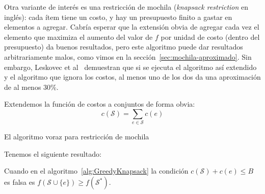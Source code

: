   Otra variante de interés es una restricción de mochila
  (\emph{\foreignlanguage{english}{knapsack restriction}} en inglés):
  cada ítem tiene un costo,
  y hay un presupuesto finito a gastar en elementos a agregar.
  Cabría esperar que la extensión obvia
  de agregar cada vez el elemento que maximiza el aumento del valor de \(f\)
  por unidad de costo
  (dentro del presupuesto)
  da buenos resultados,
  pero este algoritmo puede dar resultados arbitrariamente malos,
  como vimos en la sección~\ref{sec:mochila-aproximado}.
  Sin embargo,
  Leskovec et al~%
    \cite{leskovec07:_cost_effective_outbreak_detection_networks}
  demuestran que si se ejecuta el algoritmo así extendido
  y el algoritmo que ignora los costos,
  al menos uno de los dos da una aproximación de al menos 30\%.

  Extendemos la función de costos a conjuntos de forma obvia:
  \begin{equation*}
    c(\mathscr{S})
      = \sum_{e \in \mathscr{S}} c(e)
  \end{equation*}
  \begin{algorithm}[htbp]
    \DontPrintSemicolon\Indp

    \caption{El algoritmo voraz para restricción de mochila}
    \label{alg:GreedyKnapsack}
  \end{algorithm}
  Tenemos el siguiente resultado:
  \begin{lemma}
    \label{lem:greedy-knapsack}
    Cuando en el algoritmo~\ref{alg:GreedyKnapsack}
    la condición \(c(\mathscr{S}) + c(e) \le  B\) es falsa
    es \(f(\mathscr{S} \cup \{e\}) \ge f(\mathscr{S}^*)\).
  \end{lemma}
